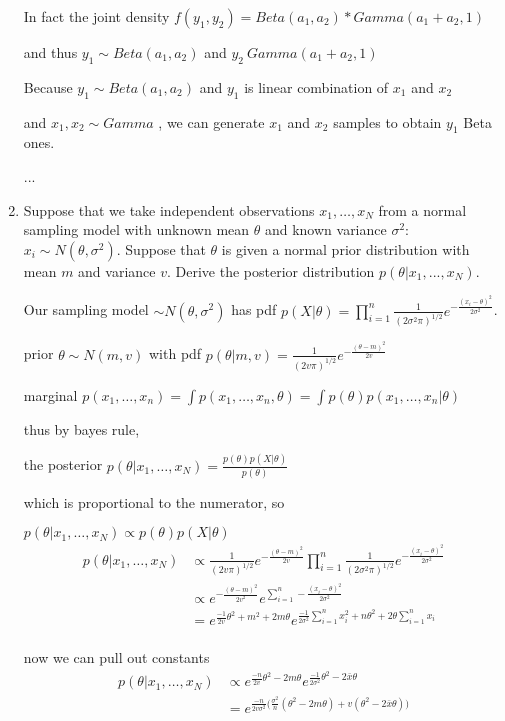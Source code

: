 \documentclass{homework}
\begin{document}
\begin{enumerate}[label=(\Alph*)]
\par In fact the joint density $f(y_1,y_2) = Beta(a_1,a_2) * Gamma(a_1 + a_2,1)$ 
\par and thus $y_1 \sim Beta(a_1,a_2)$ and $y_2 ~ Gamma(a_1 + a_2,1)$

Because $y_1 \sim Beta(a_1,a_2)$  and $y_1$ is linear combination of $x_1$ and $x_2$ 
\par and $x_1, x_2 \sim Gamma$ , we can generate $x_1$ and $x_2$ samples to obtain $y_1$ Beta ones.
\par ...


\item Suppose that we take independent observations $x_1, \dots , x_N$ from a normal sampling model with unknown mean $\theta$ and known variance $\sigma^2$: $x_i \sim N(\theta, \sigma^{2})$. Suppose that $\theta$ is given a normal prior distribution with mean $m$ and variance $v$. Derive the posterior distribution $p(\theta | x_1,...,x_N)$.
\par Our sampling model $\sim N(\theta,\sigma^2)$ has pdf $p( X | \theta ) = \prod_{i=1}^{n}\frac{1}{{(2\sigma^2\pi)}^{1/2}}e^{-\frac{(x_i - \theta)^2}{2\sigma^2}}$.
\par prior $\theta \sim N(m,v)$ with pdf $p( \theta | m,v ) = \frac{1}{{(2v\pi)}^{1/2}}e^{-\frac{(\theta - m)^2}{2v}}$
\par marginal $p(x_1, \dots , x_n) = \int p(x_1, \dots , x_n,\theta) = \int p(\theta)p(x_1, \dots , x_n | \theta)$
\par thus by bayes rule, \par the posterior $p(\theta | x_1,\dots, x_N) = \frac{ p(\theta) p(X | \theta)}{p(\theta)}$ 
\par which is proportional to the numerator, so \par $p(\theta | x_1,\dots, x_N) \propto p(\theta) p(X | \theta)$
\begin{equation} \begin{split}
p(\theta | x_1,\dots, x_N) &\propto  \frac{1}{{(2v\pi)}^{1/2}}e^{-\frac{(\theta - m)^2}{2v}} \prod_{i=1}^{n} \frac{1}{{(2\sigma^2\pi)}^{1/2}}e^{-\frac{(x_i - \theta)^2}{2\sigma^2}} \\
 &\propto e^{-\frac{(\theta - m)^2}{2v^2}}e^{\sum_{i=1}^{n} -\frac{(x_i - \theta)^2}{2\sigma^2}} \\
 & = e^{\frac{-1}{2v}\theta^2 + m^2 + 2m\theta}e^{\frac{-1}{2\sigma^2}\sum_{i=1}^{n} x_i^2 + n\theta^2 + 2\theta\sum_{i=1}^{n}x_i} \\
 \end{split} \end{equation}
\par now we can pull out constants
\begin{equation} \begin{split}
p(\theta | x_1,\dots, x_N) &\propto e^{\frac{-n}{2v}\theta^2 -2m\theta}e^{\frac{-1}{2\sigma^2}\theta^2 -2\bar{x}\theta} \\
& = e^{\frac{-n}{2v\sigma^2} \big( \frac{\sigma^2}{n}(\theta^2 -2m\theta) + v(\theta^2 -2\bar{x}\theta) \big)} \\
\end{split} \end{equation}


\end{enumerate}
\end{document}
